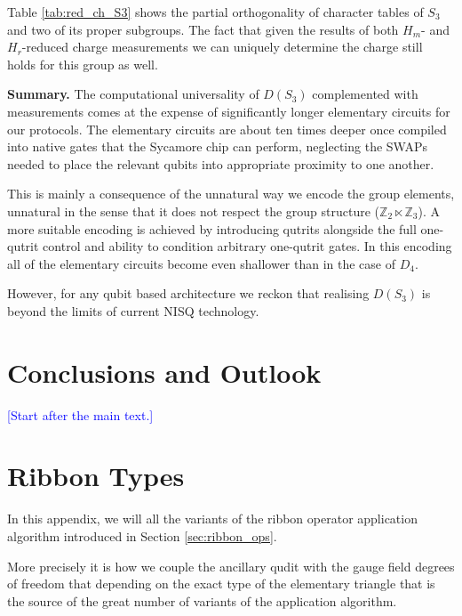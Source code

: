 \documentclass[two column]{article}
\newcommand{\jovan}[1]{\textcolor{blue}{[#1]}}
\begin{document}
Table \ref{tab:red_ch_S3} shows the partial orthogonality of character tables of $S_3$ and two of its proper subgroups. The fact that given the results of both $H_m$- and $H_r$-reduced charge measurements we can uniquely determine the charge still holds for this group as well. 

\textbf{Summary.}
The computational universality of $D(S_3)$ complemented with measurements comes at the expense of significantly longer elementary circuits for our protocols. The elementary circuits are about ten times deeper once compiled into native gates that the Sycamore chip can perform, neglecting the SWAPs needed to place the relevant qubits into appropriate proximity to one another.

This is mainly a consequence of the unnatural way we encode the group elements, unnatural in the sense that it does not respect the group structure ($\mathbb{Z}_2 \ltimes \mathbb{Z}_3$). A more suitable encoding is achieved by introducing qutrits alongside the full one-qutrit control and ability to condition arbitrary one-qutrit gates. In this encoding all of the elementary circuits become even shallower than in the case of $D_4$. 

However, for any qubit based architecture we reckon that realising $D(S_3)$ is beyond the limits of current NISQ technology.


\section{Conclusions and Outlook} \label{sec:outlook}

\jovan{Start after the main text.}


% 




%




\FloatBarrier
\onecolumn
\appendix

\section{Ribbon Types}\label{app:ribs}


In this appendix, we will all the variants of the ribbon operator application algorithm introduced in Section \ref{sec:ribbon_ops}.

More precisely it is how we couple the ancillary qudit with the gauge field degrees of freedom that depending on the exact type of the elementary triangle that is the source of the great number of variants of the application algorithm. 
\end{document}
